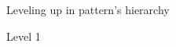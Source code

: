 \documentclass[preview]{standalone}
\begin{document}
\begin{center}
Leveling up in pattern's hierarchy

    Level 1
\end{center}
\end{document}
